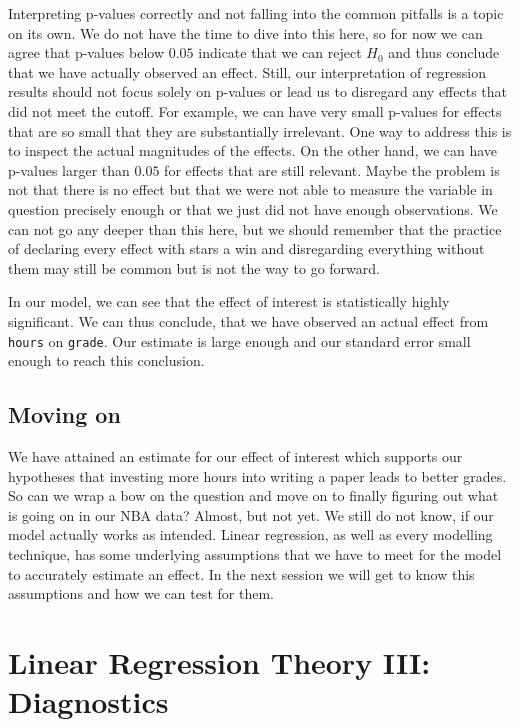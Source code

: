 \documentclass[
]{book}
\begin{document}
Interpreting p-values correctly and not falling into the common pitfalls is a
topic on its own. We do not have the time to dive into this here, so for now we
can agree that p-values below \(0.05\) indicate that we can reject \(H_0\) and thus
conclude that we have actually observed an effect. Still, our interpretation of
regression results should not focus solely on p-values or lead us to disregard
any effects that did not meet the cutoff. For example, we can have very small
p-values for effects that are so small that they are substantially irrelevant.
One way to address this is to inspect the actual magnitudes of the effects.
On the other hand, we
can have p-values larger than \(0.05\) for effects that are still relevant. Maybe
the problem is not that there is no effect but that we were not able to measure
the variable in question precisely enough or that we just did not have enough
observations. We can not go any deeper than this here, but we should remember
that the practice of declaring every effect with stars a win and disregarding
everything without them may still be common but is not the way to go forward.

In our model, we can see that the effect of interest is statistically
highly significant. We can thus conclude, that we have observed an actual effect
from \texttt{hours} on \texttt{grade}. Our estimate is large enough and our standard error
small enough to reach this conclusion.

\hypertarget{moving-on-1}{%
\section{Moving on}\label{moving-on-1}}

We have attained an estimate for our effect of interest which supports our
hypotheses that investing more hours into writing a paper leads to better grades.
So can we wrap a bow on the question and move on to finally figuring out what
is going on in our NBA data? Almost, but not yet. We still do not know, if our
model actually works as intended. Linear regression, as well as every modelling
technique, has some underlying assumptions that we have to meet for the model
to accurately estimate an effect. In the next session we will get to know this
assumptions and how we can test for them.

\hypertarget{log-t-3}{%
\chapter{Linear Regression Theory III: Diagnostics}\label{log-t-3}}
\end{document}
